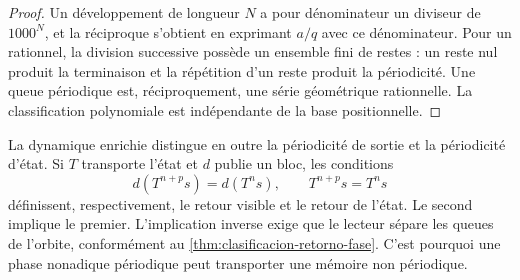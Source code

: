 \begin{proof}
Un développement de longueur \(N\) a pour dénominateur un diviseur de \(1000^N\), et
la réciproque s’obtient en exprimant \(a/q\) avec ce dénominateur. Pour un
rationnel, la division successive possède un ensemble fini de restes : un reste
nul produit la terminaison et la répétition d’un reste produit la périodicité.
Une queue périodique est, réciproquement, une série géométrique rationnelle. La
classification polynomiale est indépendante de la base positionnelle.
\end{proof}

La dynamique enrichie distingue en outre la périodicité de sortie et la
périodicité d’état. Si \(T\) transporte l’état et \(d\) publie un
bloc, les conditions
\[
 d(T^{n+p}s)=d(T^n s),
 \qquad
 T^{n+p}s=T^n s
\]
définissent, respectivement, le retour visible et le retour de l'état. Le second
implique le premier. L'implication inverse exige que le lecteur sépare les
queues de l'orbite, conformément au
\cref{thm:clasificacion-retorno-fase}. C'est pourquoi une phase nonadique périodique
peut transporter une mémoire non périodique.

